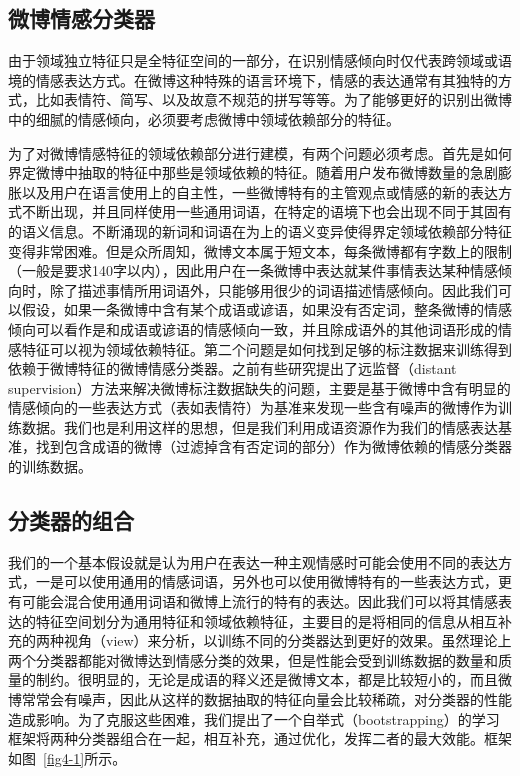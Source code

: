 \subsection{微博情感分类器}
\label{context}
由于领域独立特征只是全特征空间的一部分，在识别情感倾向时仅代表跨领域或语境的情感表达方式。在微博这种特殊的语言环境下，情感的表达通常有其独特的方式，比如表情符、简写、以及故意不规范的拼写等等。为了能够更好的识别出微博中的细腻的情感倾向，必须要考虑微博中领域依赖部分的特征。

为了对微博情感特征的领域依赖部分进行建模，有两个问题必须考虑。首先是如何界定微博中抽取的特征中那些是领域依赖的特征。随着用户发布微博数量的急剧膨胀以及用户在语言使用上的自主性，一些微博特有的主管观点或情感的新的表达方式不断出现，并且同样使用一些通用词语，在特定的语境下也会出现不同于其固有的语义信息。不断涌现的新词和词语在为上的语义变异使得界定领域依赖部分特征变得非常困难。但是众所周知，微博文本属于短文本，每条微博都有字数上的限制（一般是要求140字以内），因此用户在一条微博中表达就某件事情表达某种情感倾向时，除了描述事情所用词语外，只能够用很少的词语描述情感倾向。因此我们可以假设，如果一条微博中含有某个成语或谚语，如果没有否定词，整条微博的情感倾向可以看作是和成语或谚语的情感倾向一致，并且除成语外的其他词语形成的情感特征可以视为领域依赖特征。第二个问题是如何找到足够的标注数据来训练得到依赖于微博特征的微博情感分类器。之前有些研究提出了远监督（distant supervision）方法来解决微博标注数据缺失的问题，主要是基于微博中含有明显的情感倾向的一些表达方式（表如表情符）为基准来发现一些含有噪声的微博作为训练数据。我们也是利用这样的思想，但是我们利用成语资源作为我们的情感表达基准，找到包含成语的微博（过滤掉含有否定词的部分）作为微博依赖的情感分类器的训练数据。

\subsection{分类器的组合}
\label{combination}
我们的一个基本假设就是认为用户在表达一种主观情感时可能会使用不同的表达方式，一是可以使用通用的情感词语，另外也可以使用微博特有的一些表达方式，更有可能会混合使用通用词语和微博上流行的特有的表达。因此我们可以将其情感表达的特征空间划分为通用特征和领域依赖特征，主要目的是将相同的信息从相互补充的两种视角（view）来分析，以训练不同的分类器达到更好的效果。虽然理论上两个分类器都能对微博达到情感分类的效果，但是性能会受到训练数据的数量和质量的制约。很明显的，无论是成语的释义还是微博文本，都是比较短小的，而且微博常常会有噪声，因此从这样的数据抽取的特征向量会比较稀疏，对分类器的性能造成影响。为了克服这些困难，我们提出了一个自举式（bootstrapping）的学习框架将两种分类器组合在一起，相互补充，通过优化，发挥二者的最大效能。框架如图~\ref{fig4-1}所示。

